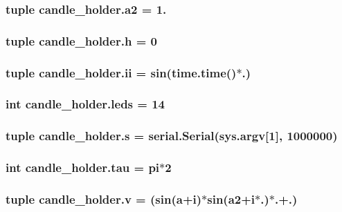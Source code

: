 \subsubsection[{a2}]{\setlength{\rightskip}{0pt plus 5cm}tuple candle\+\_\+holder.\+a2 = 1.}\label{namespacecandle__holder_adb99588fa8a4b90d8c0d3e6fb3c91ca9}
\hypertarget{namespacecandle__holder_a89636e990d51ad734a60569c4028d605}{}
\subsubsection[{h}]{\setlength{\rightskip}{0pt plus 5cm}tuple candle\+\_\+holder.\+h = 0}\label{namespacecandle__holder_a89636e990d51ad734a60569c4028d605}
\hypertarget{namespacecandle__holder_a572ae2a8b808ac93694214d3a8c038a1}{}
\subsubsection[{ii}]{\setlength{\rightskip}{0pt plus 5cm}tuple candle\+\_\+holder.\+ii = sin(time.\+time()$\ast$.)}\label{namespacecandle__holder_a572ae2a8b808ac93694214d3a8c038a1}
\hypertarget{namespacecandle__holder_a3004562a5c29137fcef45009d5ef6378}{}
\subsubsection[{leds}]{\setlength{\rightskip}{0pt plus 5cm}int candle\+\_\+holder.\+leds = 14}\label{namespacecandle__holder_a3004562a5c29137fcef45009d5ef6378}
\hypertarget{namespacecandle__holder_a4f529b1a261a820096bb5a2bb7968a88}{}
\subsubsection[{s}]{\setlength{\rightskip}{0pt plus 5cm}tuple candle\+\_\+holder.\+s = serial.\+Serial(sys.\+argv\mbox{[}1\mbox{]}, 1000000)}\label{namespacecandle__holder_a4f529b1a261a820096bb5a2bb7968a88}
\hypertarget{namespacecandle__holder_a40a4d3ecb3bd284031d3fd6cf6771b00}{}
\subsubsection[{tau}]{\setlength{\rightskip}{0pt plus 5cm}int candle\+\_\+holder.\+tau = pi$\ast$2}\label{namespacecandle__holder_a40a4d3ecb3bd284031d3fd6cf6771b00}
\hypertarget{namespacecandle__holder_abd010b1df2759f4f4b865362247a5fa2}{}
\subsubsection[{v}]{\setlength{\rightskip}{0pt plus 5cm}tuple candle\+\_\+holder.\+v = (sin({\bf a}+i)$\ast$sin({\bf a2}+i$\ast$.)$\ast$.+.)}\label{namespacecandle__holder_abd010b1df2759f4f4b865362247a5fa2}

